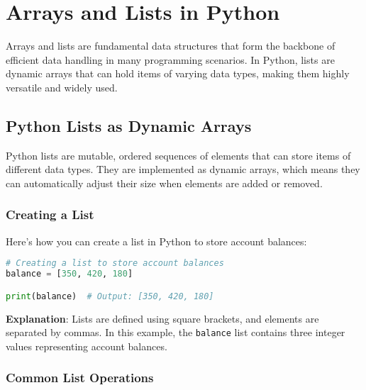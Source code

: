\chapter{Arrays and Lists in Python}\label{chap:arrays_lists}

Arrays and lists are fundamental data structures that form the backbone of efficient data handling in many programming scenarios. In Python, lists are dynamic arrays that can hold items of varying data types, making them highly versatile and widely used.

\section{Python Lists as Dynamic Arrays}\label{sec:python_lists}

Python lists are mutable, ordered sequences of elements that can store items of different data types. They are implemented as dynamic arrays, which means they can automatically adjust their size when elements are added or removed.

\subsection{Creating a List}\label{subsec:creating_list}

Here's how you can create a list in Python to store account balances:

\begin{fullwidth}
\begin{lstlisting}[language=Python, caption=Creating a list to store account balances]
# Creating a list to store account balances
balance = [350, 420, 180]

print(balance)  # Output: [350, 420, 180]
\end{lstlisting}
\end{fullwidth}

\textbf{Explanation}: Lists are defined using square brackets, and elements are separated by commas. In this example, the \texttt{balance} list contains three integer values representing account balances.

\subsection{Common List Operations}\label{subsec:list_operations}

